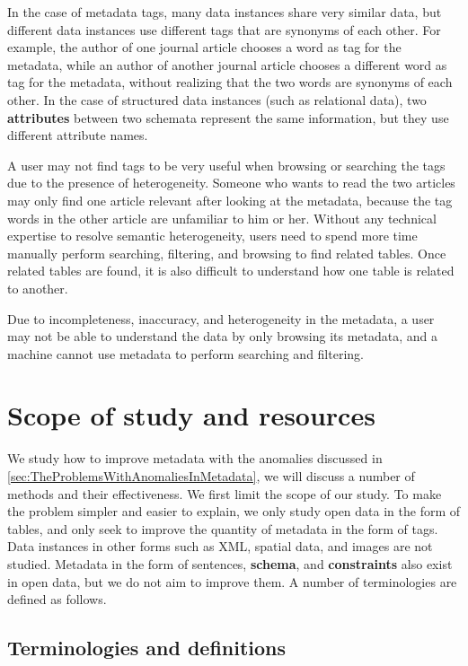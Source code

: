 In the case of metadata tags, many data instances share very similar data, but different data instances use different tags that are synonyms of each other. For example, the author of one journal article chooses a word as tag for the metadata, while an author of another journal article chooses a different word as tag for the metadata, without realizing that the two words are synonyms of each other. In the case of structured data instances (such as relational data), two \textbf{\glspl{attribute}} between two schemata represent the same information, but they use different attribute names.

A user may not find tags to be very useful when browsing or searching the tags due to the presence of heterogeneity. Someone who wants to read the two articles may only find one article relevant after looking at the metadata, because the tag words in the other article are unfamiliar to him or her. Without any technical expertise to resolve semantic heterogeneity, users need to spend more time manually perform searching, filtering, and browsing to find related tables. Once related tables are found, it is also difficult to understand how one table is related to another.

Due to incompleteness, inaccuracy, and heterogeneity in the metadata, a user may not be able to understand the data by only browsing its metadata, and a machine cannot use metadata to perform searching and filtering.

\section{Scope of study and resources}
\label{sec:ScopeOfStudyAndResources}

We study how to improve metadata with the anomalies discussed in \autoref{sec:TheProblemsWithAnomaliesInMetadata}, we will discuss a number of methods and their effectiveness. We first limit the scope of our study. To make the problem simpler and easier to explain, we only study open data in the form of tables, and only seek to improve the quantity of metadata in the form of tags. Data instances in other forms such as XML, spatial data, and images are not studied. Metadata in the form of sentences, \textbf{\gls{schema}}, and \textbf{\glspl{constraint}} also exist in open data, but we do not aim to improve them. A number of terminologies are defined as follows.

\subsection{Terminologies and definitions}

